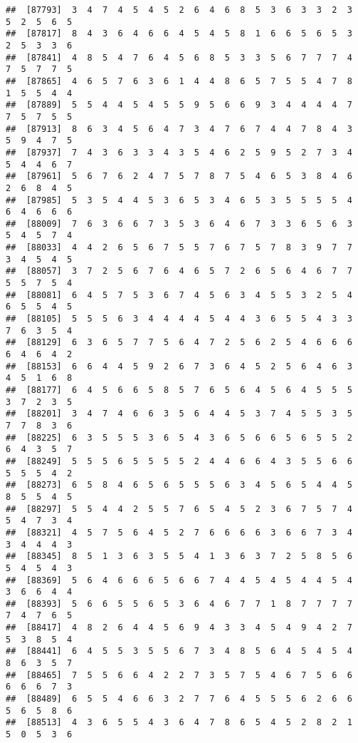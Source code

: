 \documentclass[
]{book}
\begin{document}
\begin{verbatim}
##  [87793]  3  4  7  4  5  4  5  2  6  4  6  8  5  3  6  3  3  2  3  5  2  5  6  5
##  [87817]  8  4  3  6  4  6  6  4  5  4  5  8  1  6  6  5  6  5  3  2  5  3  3  6
##  [87841]  4  8  5  4  7  6  4  5  6  8  5  3  3  5  6  7  7  7  4  7  5  7  7  5
##  [87865]  4  6  5  7  6  3  6  1  4  4  8  6  5  7  5  5  4  7  8  1  5  5  4  4
##  [87889]  5  5  4  4  5  4  5  5  9  5  6  6  9  3  4  4  4  4  7  7  5  7  5  5
##  [87913]  8  6  3  4  5  6  4  7  3  4  7  6  7  4  4  7  8  4  3  5  9  4  7  5
##  [87937]  7  4  3  6  3  3  4  3  5  4  6  2  5  9  5  2  7  3  4  5  4  4  6  7
##  [87961]  5  6  7  6  2  4  7  5  7  8  7  5  4  6  5  3  8  4  6  2  6  8  4  5
##  [87985]  5  3  5  4  4  5  3  6  5  3  4  6  5  3  5  5  5  5  4  6  4  6  6  6
##  [88009]  7  6  3  6  6  7  3  5  3  6  4  6  7  3  3  6  5  6  3  5  4  5  7  4
##  [88033]  4  4  2  6  5  6  7  5  5  7  6  7  5  7  8  3  9  7  7  3  4  5  4  5
##  [88057]  3  7  2  5  6  7  6  4  6  5  7  2  6  5  6  4  6  7  7  5  5  7  5  4
##  [88081]  6  4  5  7  5  3  6  7  4  5  6  3  4  5  5  3  2  5  4  6  5  5  4  5
##  [88105]  5  5  5  6  3  4  4  4  4  5  4  4  3  6  5  5  4  3  3  7  6  3  5  4
##  [88129]  6  3  6  5  7  7  5  6  4  7  2  5  6  2  5  4  6  6  6  6  4  6  4  2
##  [88153]  6  6  4  4  5  9  2  6  7  3  6  4  5  2  5  6  4  6  3  4  5  1  6  8
##  [88177]  6  4  5  6  6  5  8  5  7  6  5  6  4  5  6  4  5  5  5  3  7  2  3  5
##  [88201]  3  4  7  4  6  6  3  5  6  4  4  5  3  7  4  5  5  3  5  7  7  8  3  6
##  [88225]  6  3  5  5  5  3  6  5  4  3  6  5  6  6  5  6  5  5  2  6  4  3  5  7
##  [88249]  5  5  5  6  5  5  5  5  2  4  4  6  6  4  3  5  5  6  6  5  5  5  4  2
##  [88273]  6  5  8  4  6  5  6  5  5  5  6  3  4  5  6  5  4  4  5  8  5  5  4  5
##  [88297]  5  5  4  4  2  5  5  7  6  5  4  5  2  3  6  7  5  7  4  5  4  7  3  4
##  [88321]  4  5  7  5  6  4  5  2  7  6  6  6  6  3  6  6  7  3  4  3  4  4  4  3
##  [88345]  8  5  1  3  6  3  5  5  4  1  3  6  3  7  2  5  8  5  6  5  4  5  4  3
##  [88369]  5  6  4  6  6  6  5  6  6  7  4  4  5  4  5  4  4  5  4  3  6  6  4  4
##  [88393]  5  6  6  5  5  6  5  3  6  4  6  7  7  1  8  7  7  7  7  7  4  7  6  5
##  [88417]  4  8  2  6  4  4  5  6  9  4  3  3  4  5  4  9  4  2  7  5  3  8  5  4
##  [88441]  6  4  5  5  3  5  5  6  7  3  4  8  5  6  4  5  4  5  4  8  6  3  5  7
##  [88465]  7  5  5  6  6  4  2  2  7  3  5  7  5  4  6  7  5  6  6  6  6  6  7  3
##  [88489]  6  5  5  4  6  6  3  2  7  7  6  4  5  5  5  6  2  6  6  5  6  5  8  6
##  [88513]  4  3  6  5  5  4  3  6  4  7  8  6  5  4  5  2  8  2  1  5  0  5  3  6

\end{verbatim}
\end{document}
